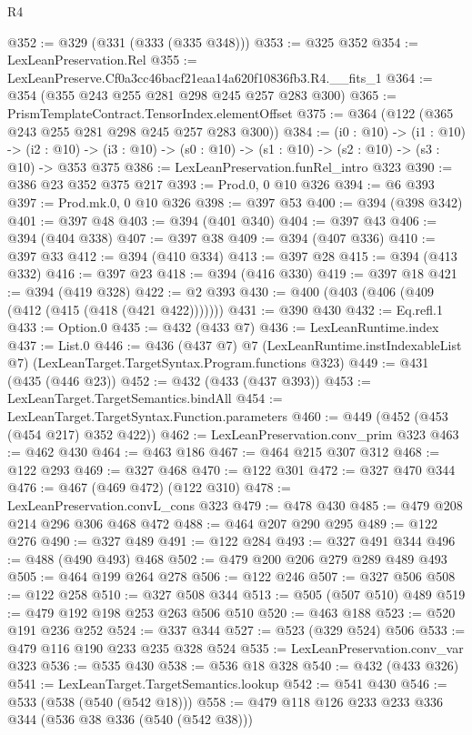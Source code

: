 \begin{lexlean}{R4}
\begin{coremodule}
@352 := @329 (@331 (@333 (@335 @348)))
@353 := @325 @352
@354 := LexLeanPreservation.Rel
@355 := LexLeanPreserve.Cf0a3cc46bacf21eaa14a620f10836fb3.R4.__fits_1
@364 := @354 (@355 @243 @255 @281 @298 @245 @257 @283 @300)
@365 := PrismTemplateContract.TensorIndex.elementOffset
@375 := @364 (@122 (@365 @243 @255 @281 @298 @245 @257 @283 @300))
@384 := (i0 : @10) ->
  (i1 : @10) ->
  (i2 : @10) -> (i3 : @10) -> (s0 : @10) -> (s1 : @10) -> (s2 : @10) -> (s3 : @10) -> @353 @375
@386 := LexLeanPreservation.funRel_intro @323
@390 := @386 @23 @352 @375 @217
@393 := Prod.{0, 0} @10 @326
@394 := @6 @393
@397 := Prod.mk.{0, 0} @10 @326
@398 := @397 @53
@400 := @394 (@398 @342)
@401 := @397 @48
@403 := @394 (@401 @340)
@404 := @397 @43
@406 := @394 (@404 @338)
@407 := @397 @38
@409 := @394 (@407 @336)
@410 := @397 @33
@412 := @394 (@410 @334)
@413 := @397 @28
@415 := @394 (@413 @332)
@416 := @397 @23
@418 := @394 (@416 @330)
@419 := @397 @18
@421 := @394 (@419 @328)
@422 := @2 @393
@430 := @400 (@403 (@406 (@409 (@412 (@415 (@418 (@421 @422)))))))
@431 := @390 @430
@432 := Eq.refl.{1}
@433 := Option.{0}
@435 := @432 (@433 @7)
@436 := LexLeanRuntime.index
@437 := List.{0}
@446 := @436
    (@437 @7)
    @7
    (LexLeanRuntime.instIndexableList @7)
    (LexLeanTarget.TargetSyntax.Program.functions @323)
@449 := @431 (@435 (@446 @23))
@452 := @432 (@433 (@437 @393))
@453 := LexLeanTarget.TargetSemantics.bindAll
@454 := LexLeanTarget.TargetSyntax.Function.parameters
@460 := @449 (@452 (@453 (@454 @217) @352 @422))
@462 := LexLeanPreservation.conv_prim @323
@463 := @462 @430
@464 := @463 @186
@467 := @464 @215 @307 @312
@468 := @122 @293
@469 := @327 @468
@470 := @122 @301
@472 := @327 @470 @344
@476 := @467 (@469 @472) (@122 @310)
@478 := LexLeanPreservation.convL_cons @323
@479 := @478 @430
@485 := @479 @208 @214 @296 @306 @468 @472
@488 := @464 @207 @290 @295
@489 := @122 @276
@490 := @327 @489
@491 := @122 @284
@493 := @327 @491 @344
@496 := @488 (@490 @493) @468
@502 := @479 @200 @206 @279 @289 @489 @493
@505 := @464 @199 @264 @278
@506 := @122 @246
@507 := @327 @506
@508 := @122 @258
@510 := @327 @508 @344
@513 := @505 (@507 @510) @489
@519 := @479 @192 @198 @253 @263 @506 @510
@520 := @463 @188
@523 := @520 @191 @236 @252
@524 := @337 @344
@527 := @523 (@329 @524) @506
@533 := @479 @116 @190 @233 @235 @328 @524
@535 := LexLeanPreservation.conv_var @323
@536 := @535 @430
@538 := @536 @18 @328
@540 := @432 (@433 @326)
@541 := LexLeanTarget.TargetSemantics.lookup
@542 := @541 @430
@546 := @533 (@538 (@540 (@542 @18)))
@558 := @479 @118 @126 @233 @233 @336 @344 (@536 @38 @336 (@540 (@542 @38)))

\end{coremodule}
\end{lexlean}
